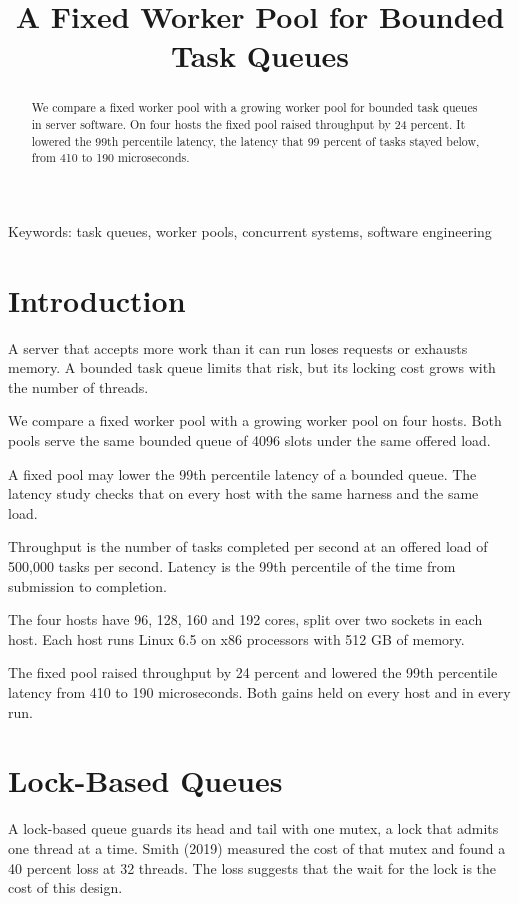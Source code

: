 \documentclass{article}
\title{A Fixed Worker Pool for Bounded Task Queues}
\date{}
\begin{document}
\maketitle

\begin{abstract}
We compare a fixed worker pool with a growing worker pool for bounded task queues in server software. On four hosts the fixed pool raised throughput by 24 percent. It lowered the 99th percentile latency, the latency that 99 percent of tasks stayed below, from 410 to 190 microseconds.
\end{abstract}

\noindent Keywords: task queues, worker pools, concurrent systems, software engineering

\section{Introduction}

A server that accepts more work than it can run loses requests or exhausts memory. A bounded task queue limits that risk, but its locking cost grows with the number of threads.

We compare a fixed worker pool with a growing worker pool on four hosts. Both pools serve the same bounded queue of 4096 slots under the same offered load.

A fixed pool may lower the 99th percentile latency of a bounded queue. The latency study checks that on every host with the same harness and the same load.

Throughput is the number of tasks completed per second at an offered load of 500,000 tasks per second. Latency is the 99th percentile of the time from submission to completion.

The four hosts have 96, 128, 160 and 192 cores, split over two sockets in each host. Each host runs Linux 6.5 on x86 processors with 512 GB of memory.

The fixed pool raised throughput by 24 percent and lowered the 99th percentile latency from 410 to 190 microseconds. Both gains held on every host and in every run.

\section{Lock-Based Queues}

A lock-based queue guards its head and tail with one mutex, a lock that admits one thread at a time. Smith (2019) measured the cost of that mutex and found a 40 percent loss at 32 threads. The loss suggests that the wait for the lock is the cost of this design.
\end{document}
